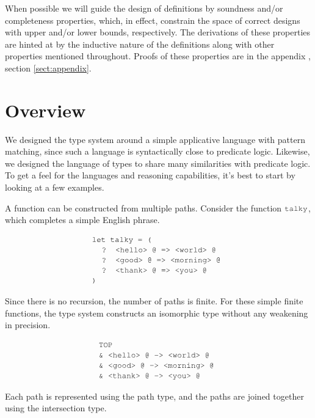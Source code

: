 \documentclass[acmsmall]{acmart}
\theoremstyle{definition}
\begin{document}
When possible we will guide the design of definitions by soundness and/or completeness properties,
which, in effect, constrain the space of correct designs with upper and/or lower bounds, respectively. 
The derivations of these properties are hinted at by the inductive nature of the definitions 
along with other properties mentioned throughout.
Proofs of these properties are in the appendix , section \ref{sect:appendix}.

\section{Overview}
\label{sec:overview}
We designed the type system around a simple applicative language with pattern matching,
since such a language is syntactically close to predicate logic. Likewise,
we designed the language of types to share many similarities with predicate logic. 
To get a feel for the languages and reasoning capabilities, it's best to start by
looking at a few examples.


A function can be constructed from multiple paths. 
Consider the function $\J{talky}$, which completes a simple English phrase.

\[
  \begin{array}[t]{@{} l}
    \J{let talky = (}
      \\
      \I \J{? <hello> @ => <world> @}
      \\
      \I \J{? <good> @ => <morning> @} 
      \\
      \I \J{? <thank> @ => <you> @} 
      \\
    \J{)}
  \end{array}
\]

\noindent
Since there is no recursion, the number of paths is finite.
For these simple finite functions, the type system constructs
an isomorphic type without any weakening in precision. 

\[
  \begin{array}[t]{@{} l}
    \J{TOP}
      \\
      \J{\& <hello> @ -> <world> @}
      \\
      \J{\& <good> @ -> <morning> @} 
      \\
      \J{\& <thank> @ -> <you> @} 
  \end{array}
\]

\noindent
Each path is represented using the path type,
and the paths are joined together using the intersection type.
\end{document}
